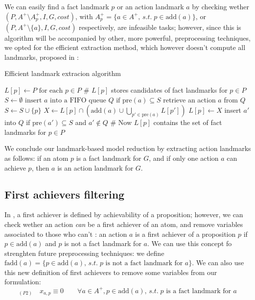 We can easily find a fact landmark $p$ or an action landmark $a$ by checking wether $(P,A^+\setminus A^+_p,I,G,cost)$, with $A^+_p=\{a\in A^+,\,s.t.\;p\in \mbox{add}(a)\}$, or $(P,A^+\setminus \{a\},I,G,cost)$ respectively, are infeasible tasks; however, since this is algorithm will be accompanied by other, more powerful, preprocessing techniques, we opted for the efficient extraction method, which however doesn't compute all landmarks, proposed in \cite{Imai_15}:
\begin{algorithm}[h]
    \caption{Efficient landmark extracion algorithm}
    \begin{algorithmic}
        \State $L[p]\gets P\mbox{ for each } p\in P$ \qquad \# $L[p]$ stores candidates of fact landmarks for $p\in P$
        \State $S\gets\emptyset$
            \State $\mbox{insert }a\mbox{ into a FIFO queue }Q\mbox{ if }\mbox{pre}(a)\subseteq S$
        \EndFor
            \State retrieve an action $a$ from $Q$
                \State $S\gets S\cup\{p\}$
                \State $X\gets L[p]\cap(\mbox{add}(a)\cup\bigcup_{p'\in \mbox{pre}(a)}L[p'])$
                    \State $L[p]\gets X$
                    \State insert $a'$ into $Q$ if $\mbox{pre}(a')\subseteq S$ and $a'\not\in Q$
                    \EndFor
                \EndIf
            \EndFor
        \EndWhile
        \State \# Now $L[p]$ contains the set of fact landmarks for $p\in P$
    \end{algorithmic}
\end{algorithm}

We conclude our landmark-based model reduction by extracting action landmarks as follows: if an atom $p$ is a fact landmark for $G$, and if only one action $a$ can achieve $p$, then $a$ is an action landmark for $G$.

\subsection{First achievers filtering}
In \cite{LB_Haslum_12}, a first achiever is defined by achievability of a proposition; however, we can check wether an action \textit{can} be a first achiever of an atom, and remove variables associated to those who can't \cite{Imai_15}: an action $a$ is a first achiever of a proposition $p$ if $p\in \mbox{add}(a)$ and $p$ is not a fact landmark for $a$.
We can use this concept fo strenghten future preprocessing techniques: we define $\mbox{fadd}(a)=\{p\in \mbox{add}(a),\,s.t.\;p\mbox{ is not a fact landmark for }a\}$.
We can also use this new definition of first achievers to remove some variables from our formulation:
$$_{(P2)}\quad x_{a,p}\equiv0\qquad\forall a\in A^+,p\in \mbox{add}(a),\,s.t.\;p\mbox{ is a fact landmark for }a$$

